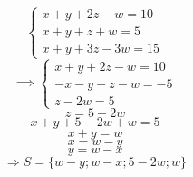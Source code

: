 \documentclass{article}
\begin{document}
\[
\left\{
\begin{array}{l}
x + y + 2z - w = 10 \\
x + y + z + w = 5 \\
x + y + 3z - 3w = 15
\end{array}
\right.
\]
\[
\implies
\left\{
\begin{array}{l}
x + y + 2z - w = 10 \\
-x - y - z - w = -5 \\
z - 2w = 5
\end{array}
\right.
\]
\[
z = 5 - 2w
\]
\[
x + y + 5 - 2w + w = 5
\]
\[
x + y = w
\]
\[
x = w - y
\]
\[
y = w - x
\]
\[
\Rightarrow S = \{w-y; w-x; 5-2w; w\}
\]
\end{document}
